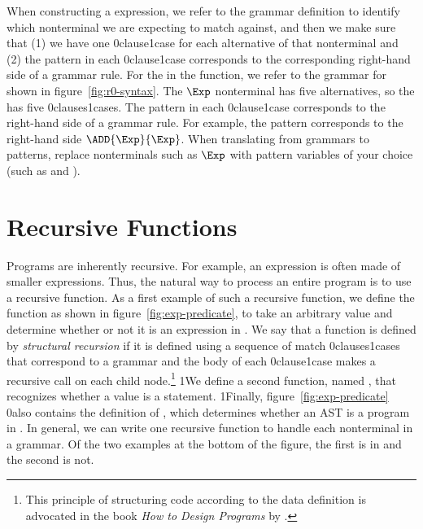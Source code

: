 \documentclass[7x10]{TimesAPriori_MIT}%
\def\racketEd{0}
\def\pythonEd{1}
\providecommand{\BookEdition}{1}
\let\edition\BookEdition
\newcommand{\racket}[1]{{\if\edition\racketEd{#1}\fi}}
\newcommand{\pythonColor}[0]{}
\newcommand{\python}[1]{{\if\edition\pythonEd\pythonColor #1\fi}}
\numberwithin{theorem}{chapter}
\numberwithin{definition}{chapter}
\numberwithin{equation}{chapter}
\begin{document}
When constructing a  expression, we refer to the grammar
definition to identify which nonterminal we are expecting to match
against, and then we make sure that (1) we have one
\racket{clause}\python{case} for each alternative of that nonterminal
and (2) the pattern in each \racket{clause}\python{case}
corresponds to the corresponding right-hand side of a grammar
rule. For the  in the  function, we refer to
the grammar for \LangInt{} shown in figure~\ref{fig:r0-syntax}. The $\Exp$
nonterminal has five alternatives, so the  has five
\racket{clauses}\python{cases}.  The pattern in each
\racket{clause}\python{case} corresponds to the right-hand side of a
grammar rule. For example, the pattern 
corresponds to the right-hand side $\ADD{\Exp}{\Exp}$. When
translating from grammars to patterns, replace nonterminals such as
$\Exp$ with pattern variables of your choice (such as  and
).


\section{Recursive Functions}
\label{sec:recursion}

Programs are inherently recursive. For example, an expression is often
made of smaller expressions. Thus, the natural way to process an
entire program is to use a recursive function.  As a first example of
such a recursive function, we define the function  as
shown in figure~\ref{fig:exp-predicate}, to take an arbitrary
value and determine whether or not it is an expression in \LangInt{}.
%
We say that a function is defined by \emph{structural recursion} if
it is defined using a sequence of match \racket{clauses}\python{cases}
that correspond to a grammar and the body of each
\racket{clause}\python{case} makes a recursive call on each child
node.\footnote{This principle of structuring code according to the
  data definition is advocated in the book \emph{How to Design
    Programs} by \citet{Felleisen:2001aa}.}  \python{We define a
  second function, named , that recognizes whether a value
  is a \LangInt{} statement.}  \python{Finally, }
figure~\ref{fig:exp-predicate} \racket{also} contains the definition of
, which determines whether an AST is a program in \LangInt{}.
In general, we can write one recursive function to handle each
nonterminal in a grammar. Of the
two examples at the bottom of the figure, the first is in
\LangInt{} and the second is not.
\end{document}
